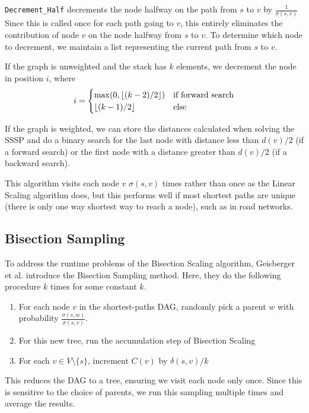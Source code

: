 \documentclass[12pt,a4paper,twoside,openright]{report}
\newcommand{\ttt}[1]{\texttt{#1}}
\DeclarePairedDelimiter\floor{\lfloor}{\rfloor}
\begin{document}
	\ttt{Decrement\_Half} decrements the node halfway on the path from $s$ to $v$ by $\frac{1}{\sigma(s,v)}$ Since this is called once for each path going to $v$, this entirely eliminates the contribution of node $v$ on the node halfway from $s$ to $v$. To determine which node to decrement, we maintain a list representing the current path from $s$ to $v$. 
	
	If the graph is unweighted and the stack has $k$ elements, we decrement the node in position $i$, where\begin{equation}
		i = \begin{cases}
			\max(0,\floor*{(k-2)/2}) & \text{if forward search}\\
			\floor*{(k-1)/2} & \text{else}
			
		\end{cases}
	\end{equation}
	
	If the graph is weighted, we can store the distances calculated when solving the SSSP and do a binary search for the last node with distance less than $d(v)/2$ (if a forward search) or the first node with a distance greater than $d(v)/2$ (if a backward search).
	
	This algorithm visits each node $v$ $\sigma(s,v)$ times rather than once as the Linear Scaling algorithm does, but this performs well if most shortest paths are unique (there is only one way shortest way to reach a node), such as in road networks.
	
	\subsection{Bisection Sampling}
	
	To address the runtime problems of the Bisection Scaling algorithm, Geisberger et al. introduce the Bisection Sampling method. Here, they do the following procedure $k$ times for some constant $k$.
	\begin{enumerate}
		\item For each node $v$ in the shortest-paths DAG, randomly pick a parent $w$ with probability $\frac{\sigma(s,w)}{\sigma(s,v)}$.
		\item For this new tree, run the accumulation step of Bisection Scaling
		\item For each $v \in V \setminus \{s\}$, increment $C(v)$ by $\delta(s,v)/k$
	\end{enumerate}
	
	This reduces the DAG to a tree, ensuring we visit each node only once. Since this is sensitive to the choice of parents, we run this sampling multiple times and average the results.
	
\end{document}
